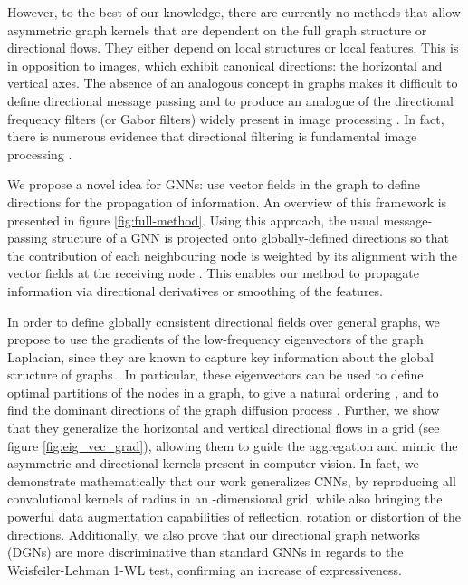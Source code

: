 \documentclass{article} \usepackage{arxiv,times}
\begin{document}
However, to the best of our knowledge, there are currently no methods that allow asymmetric graph kernels that are dependent on the full graph structure or directional flows. They either depend on local structures or local features. This is in opposition to images, which exhibit canonical directions: the horizontal and vertical axes. The absence of an analogous concept in graphs makes it difficult to define directional message passing and to produce an analogue of the directional frequency filters (or Gabor filters) widely present in image processing \cite{olah_overview_2020}. In fact, there is numerous evidence that directional filtering is fundamental image processing \cite{kang_deep_2017, antoine_two-dimensional_1996, yue_lu_finer_2005}.

We propose a novel idea for GNNs: use vector fields in the graph to define directions for the propagation of information. An overview of this framework is presented in figure \ref{fig:full-method}. Using this approach, the usual message-passing structure of a GNN is projected onto globally-defined directions so that the contribution of each neighbouring node  is weighted by its alignment with the vector fields at the receiving node . This enables our method to propagate information via directional derivatives or smoothing of the features.

In order to define globally consistent directional fields over general graphs, we propose to use the gradients of the low-frequency eigenvectors  of the graph Laplacian, since they are known to capture key information about the global structure of graphs \cite{chavel1984eigenvalues,chung1997spectral,Grebenkov_2013}. In particular, these eigenvectors can be used to define optimal partitions of the nodes in a graph, to give a natural ordering \cite{levy_laplace_beltrami_2006}, and to find the dominant directions of the graph diffusion process \cite{chung_discrete_2000,saerens2004principal}. Further, we show that they generalize the horizontal and vertical directional flows in a grid (see figure \ref{fig:eig_vec_grad}), allowing them to guide the aggregation and mimic the asymmetric and directional kernels present in computer vision. In fact, we demonstrate mathematically that our work generalizes CNNs, by reproducing all convolutional kernels of radius  in an -dimensional grid, while also bringing the powerful data augmentation capabilities of reflection, rotation or distortion of the directions. Additionally, we also prove that our directional graph networks (DGNs) are more discriminative than standard GNNs in regards to the Weisfeiler-Lehman 1-WL test, confirming an increase of expressiveness.
\end{document}
